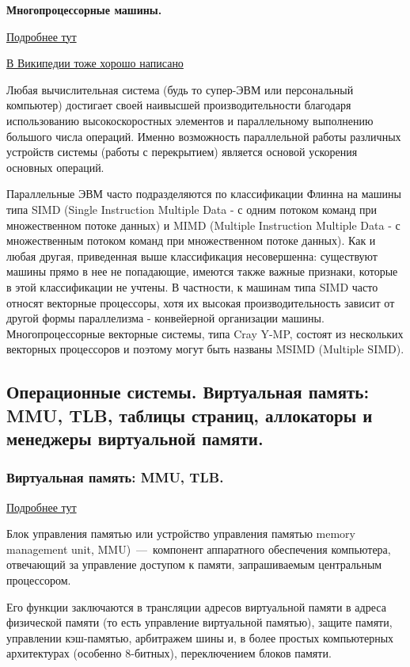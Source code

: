 \documentclass{article}
\begin{document}
\textbf{Многопроцессорные машины.}

\href{https://docstore.mik.ua/skbd/glava_10.htm}{Подробнее тут}

\href{https://ru.wikipedia.org/wiki/%D0%9C%D0%BD%D0%BE%D0%B3%D0%BE%D0%BF%D1%80%D0%BE%D1%86%D0%B5%D1%81%D1%81%D0%BE%D1%80%D0%BD%D0%BE%D1%81%D1%82%D1%8C}{В Википедии тоже хорошо написано}

Любая вычислительная система (будь то супер-ЭВМ или персональный компьютер) достигает своей наивысшей производительности благодаря использованию высокоскоростных элементов и параллельному выполнению большого числа операций. Именно возможность параллельной работы различных устройств системы (работы с перекрытием) является основой ускорения основных операций. 

Параллельные ЭВМ часто подразделяются по классификации Флинна на машины типа SIMD (Single Instruction Multiple Data - с одним потоком команд при множественном потоке данных) и MIMD (Multiple Instruction Multiple Data - с множественным потоком команд при множественном потоке данных). Как и любая другая, приведенная выше классификация несовершенна: существуют машины прямо в нее не попадающие, имеются также важные признаки, которые в этой классификации не учтены. В частности, к машинам типа SIMD часто относят векторные процессоры, хотя их высокая производительность зависит от другой формы параллелизма - конвейерной организации машины. Многопроцессорные векторные системы, типа Cray Y-MP, состоят из нескольких векторных процессоров и поэтому могут быть названы MSIMD (Multiple SIMD).

\subsection{Операционные системы. Виртуальная память: MMU, TLB, таблицы страниц, аллокаторы и менеджеры виртуальной памяти.}

\subsubsection{Виртуальная память: MMU, TLB.}

\href{https://habr.com/ru/post/211150/}{Подробнее тут}

Блок управления памятью или устройство управления памятью memory management unit, MMU)~---~компонент аппаратного обеспечения компьютера, отвечающий за управление доступом к памяти, запрашиваемым центральным процессором.

Его функции заключаются в трансляции адресов виртуальной памяти в адреса физической памяти (то есть управление виртуальной памятью), защите памяти, управлении кэш-памятью, арбитражем шины и, в более простых компьютерных архитектурах (особенно 8-битных), переключением блоков памяти. 
\end{document}
